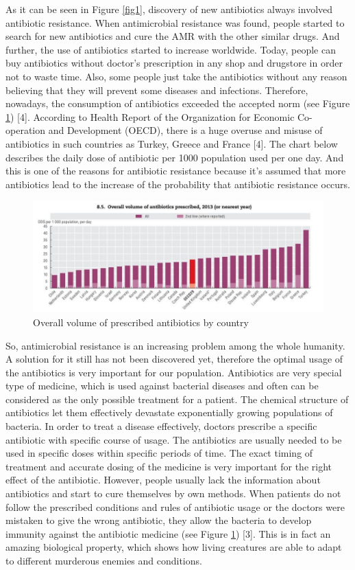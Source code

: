 As it can be seen in Figure \ref{fig1}, discovery of new antibiotics always involved antibiotic resistance. When antimicrobial resistance was found, people started to search for new antibiotics and cure the AMR with the other similar drugs. And further, the use of antibiotics started to increase worldwide. Today, people can buy antibiotics without doctor’s prescription in any shop and drugstore in order not to waste time. Also, some people just take the antibiotics without any reason believing that they will prevent some diseases and infections. Therefore, nowadays, the consumption of antibiotics exceeded the accepted norm (see Figure \ref{fig2}) [4]. According to Health Report of the Organization for Economic Co-operation and Development (OECD), there is a huge overuse and misuse of antibiotics in such countries as Turkey, Greece and France [4]. The chart below describes the daily dose of antibiotic per 1000 population used per one day. And this is one of the reasons for antibiotic resistance because it’s assumed that more antibiotics lead to the increase of the probability that antibiotic resistance occurs.

\begin{figure}[H]
  \centering
  \includegraphics[width=\textwidth]{img/Fig2}
  \caption{Overall volume of prescribed antibiotics by country}
  \label{fig2}
\end{figure}

So, antimicrobial resistance is an increasing problem among the whole humanity. A solution for it still has not been discovered yet, therefore the optimal usage of the antibiotics is very important for our population. Antibiotics are very special type of medicine, which is used against bacterial diseases and often can be considered as the only possible treatment for a patient. The chemical structure of antibiotics let them effectively devastate exponentially growing populations of bacteria. In order to treat a disease effectively, doctors prescribe a specific antibiotic with specific course of usage. The antibiotics are usually needed to be used in specific doses within specific periods of time. The exact timing of treatment and accurate dosing of the medicine is very important for the right effect of the antibiotic. However, people usually lack the information about antibiotics and start to cure themselves by own methods. When patients do not follow the prescribed conditions and rules of antibiotic usage or the doctors were mistaken to give the wrong antibiotic, they allow the bacteria to develop immunity against the antibiotic medicine (see Figure \ref{fig2}) [3]. This is in fact an amazing biological property, which shows how living creatures are able to adapt to different murderous enemies and conditions.

